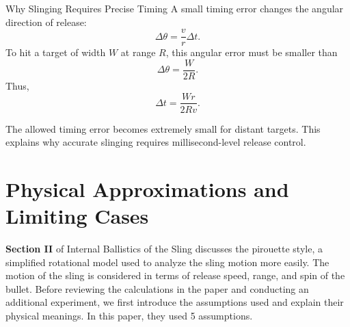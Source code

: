 \documentclass[11pt,letterpaper]{article}
\begin{document}
\begin{equationbreakdown}{Why Slinging Requires Precise Timing}
A small timing error changes the angular direction of release:
\[
    \Delta \theta = \frac{v}{r}\Delta t.
\]
To hit a target of width \(W\) at range \(R\), this angular error must
be smaller than
\[
    \Delta \theta = \frac{W}{2R}.
\]
Thus,
\[
    \Delta t = \frac{Wr}{2Rv}.
\]

The allowed timing error becomes extremely small for distant targets.
This explains why accurate slinging requires millisecond-level release
control.
\end{equationbreakdown}
\section{Physical Approximations and Limiting Cases}
\textbf{Section II} of Internal Ballistics of the Sling discusses the pirouette style, a simplified rotational model used to analyze the sling motion more easily. The motion of the sling is considered in terms of release speed, range, and spin of the bullet. Before reviewing the calculations in the paper and conducting an additional experiment, we first introduce the assumptions used and explain their physical meanings. In this paper, they used 5 assumptions.
\end{document}
